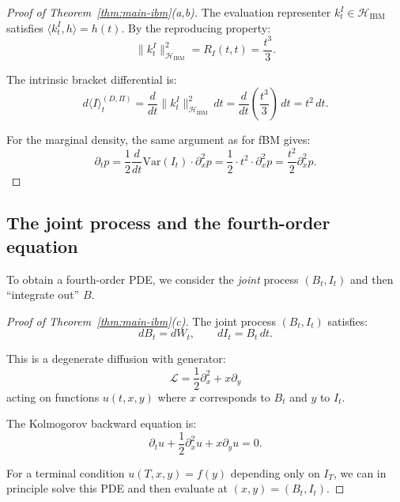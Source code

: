 \documentclass[11pt]{article}
\theoremstyle{definition}
\newcommand{\Hi}{\mathcal{H}}
\begin{document}
\begin{proof}[Proof of Theorem~\ref{thm:main-ibm}(a,b)]
The evaluation representer $k^I_t \in \Hi_{\mathrm{IBM}}$ satisfies $\langle k^I_t, h \rangle = h(t)$. By the reproducing property:
\begin{equation}
\|k^I_t\|^2_{\Hi_{\mathrm{IBM}}} = R_I(t,t) = \frac{t^3}{3}.
\end{equation}

The intrinsic bracket differential is:
\begin{equation}
d\langle I \rangle^{(D,\Pi)}_t = \frac{d}{dt}\|k^I_t\|^2_{\Hi_{\mathrm{IBM}}}\,dt = \frac{d}{dt}\left(\frac{t^3}{3}\right)\,dt = t^2\,dt.
\end{equation}

For the marginal density, the same argument as for fBM gives:
\begin{equation}
\partial_t p = \frac{1}{2}\frac{d}{dt}\mathrm{Var}(I_t) \cdot \partial_x^2 p = \frac{1}{2} \cdot t^2 \cdot \partial_x^2 p = \frac{t^2}{2}\partial_x^2 p.
\end{equation}
\end{proof}

\subsection{The joint process and the fourth-order equation}

To obtain a fourth-order PDE, we consider the \emph{joint} process $(B_t, I_t)$ and then ``integrate out'' $B$.

\begin{proof}[Proof of Theorem~\ref{thm:main-ibm}(c)]
The joint process $(B_t, I_t)$ satisfies:
\begin{equation}
dB_t = dW_t, \qquad dI_t = B_t\,dt.
\end{equation}

This is a degenerate diffusion with generator:
\begin{equation}
\mathcal{L} = \frac{1}{2}\partial_x^2 + x\partial_y
\end{equation}
acting on functions $u(t,x,y)$ where $x$ corresponds to $B_t$ and $y$ to $I_t$.

The Kolmogorov backward equation is:
\begin{equation}
\partial_t u + \frac{1}{2}\partial_x^2 u + x\partial_y u = 0.
\end{equation}

For a terminal condition $u(T,x,y) = f(y)$ depending only on $I_T$, we can in principle solve this PDE and then evaluate at $(x,y) = (B_t, I_t)$.
\end{proof}
\end{document}
